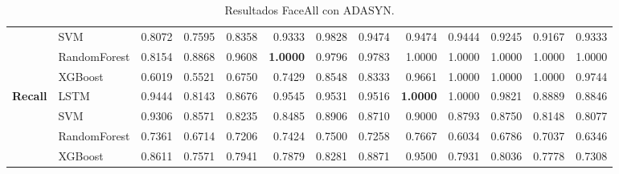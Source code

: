 \begin{table}[h]
\begin{adjustbox}{max width=15cm}
\begin{tabular}{|c|l|r|r|r|r|r|r|r|r|r|r|r|}
	& SVM &  0.8072 &  0.7595 &  0.8358 &  0.9333 &  0.9828 &  0.9474 &  0.9474 &  0.9444 &  0.9245 &  0.9167 &  0.9333 \\
	& RandomForest &  0.8154 &  0.8868 &  0.9608 &  \textbf{1.0000} &  0.9796 &  0.9783 &  1.0000 &  1.0000 &  1.0000 &  1.0000 &  1.0000 \\
	& XGBoost &  0.6019 &  0.5521 &  0.6750 &  0.7429 &  0.8548 &  0.8333 &  0.9661 &  1.0000 &  1.0000 &  1.0000 &  0.9744 \\
	\hline
	\textbf{Recall} & LSTM &  0.9444 &  0.8143 &  0.8676 &  0.9545 &  0.9531 &  0.9516 &  \textbf{1.0000} &  1.0000 &  0.9821 &  0.8889 &  0.8846 \\
	& SVM &  0.9306 &  0.8571 &  0.8235 &  0.8485 &  0.8906 &  0.8710 &  0.9000 &  0.8793 &  0.8750 &  0.8148 &  0.8077 \\
	& RandomForest &  0.7361 &  0.6714 &  0.7206 &  0.7424 &  0.7500 &  0.7258 &  0.7667 &  0.6034 &  0.6786 &  0.7037 &  0.6346 \\
	& XGBoost &  0.8611 &  0.7571 &  0.7941 &  0.7879 &  0.8281 &  0.8871 &  0.9500 &  0.7931 &  0.8036 &  0.7778 &  0.7308 \\
	\hline
\end{tabular}
\end{adjustbox}	
\caption{Resultados FaceAll con ADASYN.}
\label{tab:faceAllADASYN}
\end{table}
\newpage
